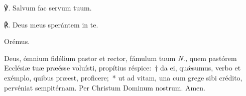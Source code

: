 ℣. Salvum fac servum tuum.

℟. Deus meus sperántem in te.

Orémus.

Deus, ómnium fidélium pastor et re\-ctor, fámulum tuum \textit{N.,} quem pastórem Ecclésiæ\thinspace \nomen{} tuæ præésse voluísti, propítius réspice:~† da ei, quǽsumus, verbo et exémplo, quibus præest, proficere;~* ut ad vitam, una cum grege sibi crédito, pervéniat sempitérnam. Per Christum Dominum nostrum. Amen.
